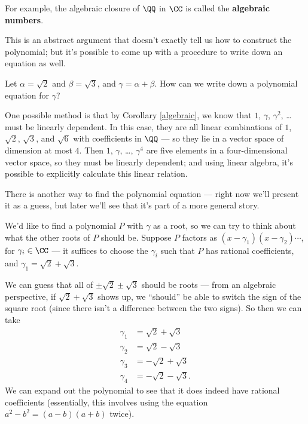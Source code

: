 For example, the algebraic closure of $\QQ$ in $\CC$ is called the \textbf{algebraic numbers}. 

This is an abstract argument that doesn't exactly tell us how to construct the polynomial; but it's possible to come up with a procedure to write down an equation as well. 

\begin{example}
    Let $\alpha = \sqrt{2}$ and $\beta = \sqrt{3}$, and $\gamma = \alpha + \beta$. How can we write down a polynomial equation for $\gamma$?
\end{example}

One possible method is that by Corollary \ref{algebraic}, we know that $1$, $\gamma$, $\gamma^2$, \ldots must be linearly dependent. In this case, they are all linear combinations of $1$, $\sqrt{2}$, $\sqrt{3}$, and $\sqrt{6}$ with coefficients in $\QQ$ --- so they lie in a vector space of dimension at most $4$. Then $1$, $\gamma$, \ldots, $\gamma^4$ are five elements in a four-dimensional vector space, so they must be linearly dependent; and using linear algebra, it's possible to explicitly calculate this linear relation. 

There is another way to find the polynomial equation --- right now we'll present it as a guess, but later we'll see that it's part of a more general story. 

We'd like to find a polynomial $P$ with $\gamma$ as a root, so we can try to think about what the other roots of $P$ should be. Suppose $P$ factors as $(x - \gamma_1)(x - \gamma_2)\cdots$, for $\gamma_i \in \CC$ --- it suffices to choose the $\gamma_i$ such that $P$ has rational coefficients, and $\gamma_1 = \sqrt{2} + \sqrt{3}$. 

We can guess that all of $\pm \sqrt{2} \pm \sqrt{3}$ should be roots --- from an algebraic perspective, if $\sqrt{2} + \sqrt{3}$ shows up, we ``should'' be able to switch the sign of the square root (since there isn't a difference between the two signs). So then we can take 
\begin{align*}
    \gamma_1 &= \sqrt{2} + \sqrt{3} \\
    \gamma_2 &= \sqrt{2} - \sqrt{3} \\
    \gamma_3 &= -\sqrt{2} + \sqrt{3} \\
    \gamma_4 &= -\sqrt{2} - \sqrt{3}.
\end{align*}
We can expand out the polynomial to see that it does indeed have rational coefficients (essentially, this involves using the equation $a^2 - b^2 = (a - b)(a + b)$ twice). 

